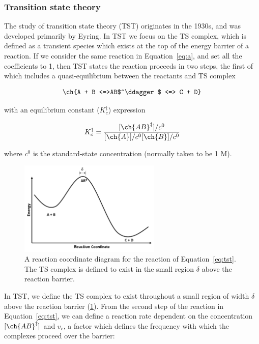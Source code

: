 \subsubsection{Transition state theory}

The study of transition state theory (TST) originates in the 1930s, and was
developed primarily by Eyring.\cite{McQuarrie1997,Steinfeld1998} In TST we
focus on the TS complex, which is defined as a transient species which exists
at the top of the energy barrier of a reaction. If we consider the same
reaction in Equation~\ref{eq:a}, and set all the coefficients to 1, then TST
states the reaction proceeds in two steps, the first of which includes a
quasi-equilibrium between the reactants and TS complex

\begin{equation}
  \ch{A + B <=>AB$^\ddagger$ <=> C + D}
  \label{eq:tst}
\end{equation}

\noindent with an equilibrium constant ($K_c^{\ddagger}$) expression

\begin{equation}
  K_c^{\ddagger} = \frac{[\ch{AB}^\ddagger]/c^0}{[\ch{A}]/c^0[\ch{B}]/c^0}
\label{eq:K}
\end{equation}

\noindent where $c^0$ is the standard-state concentration (normally taken to be
1 M).

\begin{figure}[htb]
    \centering
    \includegraphics[width=0.6\textwidth]{figures/TST-PES.png}
    \caption[A reaction coordinate diagram for a generic reaction.]{A reaction coordinate diagram for the reaction of Equation~\ref{eq:tst}. The TS complex is defined to exist in the small region $\delta$ above the reaction barrier.}
\label{fig:tst-pes}
\end{figure}

In TST, we define the TS complex to exist throughout a small region of width
$\delta$ above the reaction barrier (\ref{fig:tst-pes}). From the second step
of the reaction in Equation~\ref{eq:tst}, we can define a reaction rate
dependent on the concentration $[\ch{AB}^\ddagger]$ and $v_c$, a factor which
defines the frequency with which the complexes proceed over the barrier:


